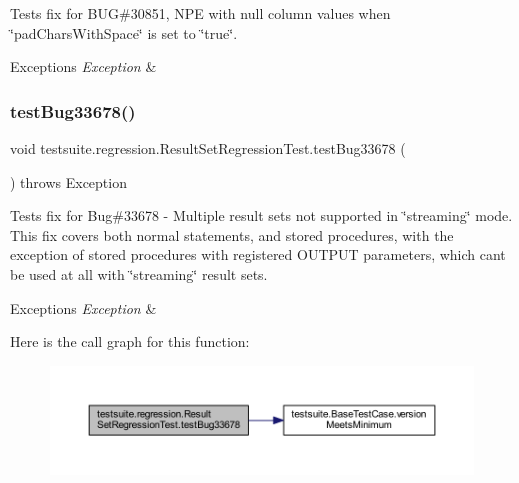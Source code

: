 Tests fix for B\+UG\#30851, N\+PE with null column values when \char`\"{}pad\+Chars\+With\+Space\char`\"{} is set to \char`\"{}true\char`\"{}.


\begin{DoxyExceptions}{Exceptions}
{\em Exception} & \\
\hline
\end{DoxyExceptions}
\mbox{\label{classtestsuite_1_1regression_1_1_result_set_regression_test_a6f45076cd422b1dadc631967a3520dbd}} 
\subsubsection{\texorpdfstring{test\+Bug33678()}{testBug33678()}}
{\footnotesize\ttfamily void testsuite.\+regression.\+Result\+Set\+Regression\+Test.\+test\+Bug33678 (\begin{DoxyParamCaption}{ }\end{DoxyParamCaption}) throws Exception}

Tests fix for Bug\#33678 -\/ Multiple result sets not supported in \char`\"{}streaming\char`\"{} mode. This fix covers both normal statements, and stored procedures, with the exception of stored procedures with registered O\+U\+T\+P\+UT parameters, which can\textquotesingle{}t be used at all with \char`\"{}streaming\char`\"{} result sets.


\begin{DoxyExceptions}{Exceptions}
{\em Exception} & \\
\hline
\end{DoxyExceptions}
Here is the call graph for this function\+:
\nopagebreak
\begin{figure}[H]
\begin{center}
\leavevmode
\includegraphics[width=350pt]{classtestsuite_1_1regression_1_1_result_set_regression_test_a6f45076cd422b1dadc631967a3520dbd_cgraph}
\end{center}
\end{figure}
\mbox{\label{classtestsuite_1_1regression_1_1_result_set_regression_test_ad141201442a5e2f03f7674ee44357a5e}} 
